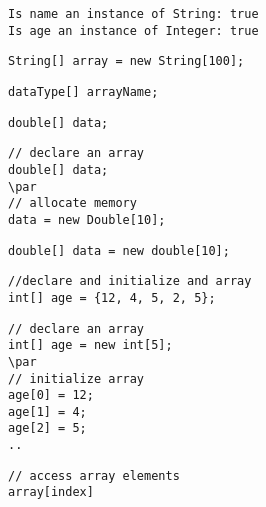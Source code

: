 \documentclass{book}
\def\lthtmlcheckvsize{\ifdim\ht\sizebox<\vsize 
  \ifdim\wd\sizebox<\hsize\expandafter\hfill\fi \expandafter\vfill
  \else\expandafter\vss\fi}%
\begin{document}
{\newpage\clearpage
{}%
\begin{lstlisting}
Is name an instance of String: true
Is age an instance of Integer: true
\end{lstlisting}%
\lthtmlfigureZ
\lthtmlcheckvsize\clearpage}

{\newpage\clearpage
{}%
\begin{lstlisting}
String[] array = new String[100];
\end{lstlisting}%
\lthtmlfigureZ
\lthtmlcheckvsize\clearpage}

{\newpage\clearpage
{}%
\begin{lstlisting}
dataType[] arrayName;
\end{lstlisting}%
\lthtmlfigureZ
\lthtmlcheckvsize\clearpage}

{\newpage\clearpage
{}%
\begin{lstlisting}
double[] data;
\end{lstlisting}%
\lthtmlfigureZ
\lthtmlcheckvsize\clearpage}

{\newpage\clearpage
{}%
\begin{lstlisting}
// declare an array
double[] data;
\par
// allocate memory
data = new Double[10];
\end{lstlisting}%
\lthtmlfigureZ
\lthtmlcheckvsize\clearpage}

{\newpage\clearpage
{}%
\begin{lstlisting}
double[] data = new double[10];
\end{lstlisting}%
\lthtmlfigureZ
\lthtmlcheckvsize\clearpage}

{\newpage\clearpage
{}%
\begin{lstlisting}
//declare and initialize and array
int[] age = {12, 4, 5, 2, 5};
\end{lstlisting}%
\lthtmlfigureZ
\lthtmlcheckvsize\clearpage}

{\newpage\clearpage
{}%
\begin{lstlisting}
// declare an array
int[] age = new int[5];
\par
// initialize array
age[0] = 12;
age[1] = 4;
age[2] = 5;
..
\end{lstlisting}%
\lthtmlfigureZ
\lthtmlcheckvsize\clearpage}

{\newpage\clearpage
{}%
\begin{lstlisting}
// access array elements
array[index]
\end{lstlisting}%
\lthtmlfigureZ
\lthtmlcheckvsize\clearpage}
\end{document}
